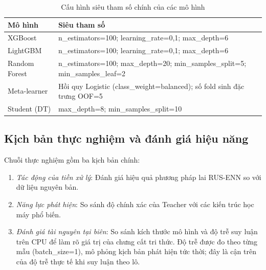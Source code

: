 \begin{table}[!t]
\centering
\caption{Cấu hình siêu tham số chính của các mô hình}
\label{tab:hyperparams}
\footnotesize
\begin{tabularx}{\columnwidth}{@{}lX@{}}
\toprule
\textbf{Mô hình} & \textbf{Siêu tham số} \\
\midrule
XGBoost       & n\_estimators=100; learning\_rate=0,1; max\_depth=6 \\
LightGBM      & n\_estimators=100; learning\_rate=0,1; max\_depth=6 \\
Random Forest & n\_estimators=100; max\_depth=20; min\_samples\_split=5; min\_samples\_leaf=2 \\
Meta-learner  & Hồi quy Logistic (class\_weight=balanced); số fold sinh đặc trưng OOF=5 \\
Student (DT)  & max\_depth=8; min\_samples\_split=10 \\
\bottomrule
\end{tabularx}
\end{table}

\subsection{Kịch bản thực nghiệm và đánh giá hiệu năng}
Chuỗi thực nghiệm gồm ba kịch bản chính:
\begin{enumerate}
    \item \textit{Tác động của tiền xử lý}: Đánh giá hiệu quả phương pháp lai RUS-ENN so với dữ liệu nguyên bản.
    \item \textit{Năng lực phát hiện}: So sánh độ chính xác của Teacher với các kiến trúc học máy phổ biến.
    \item \textit{Đánh giá tài nguyên tại biên}: So sánh kích thước mô hình và độ trễ suy luận trên CPU để làm rõ giá trị của chưng cất tri thức. Độ trễ được đo theo từng mẫu (batch\_size=1), mô phỏng kịch bản phát hiện tức thời; đây là cận trên của độ trễ thực tế khi suy luận theo lô.
\end{enumerate}

